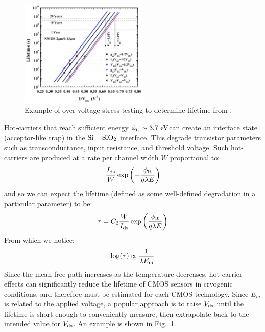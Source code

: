 \documentclass[12pt]{article}
\begin{document}
\begin{figure}[htbp]
\begin{center}
\includegraphics[width=0.55\textwidth]{figs/lifetime_vstress.png} 
\caption{Example of over-voltage stress-testing to determine lifetime from \cite{hot-carrier-effects}.}
\label{fig:lifetime}
\end{center}
\end{figure}

Hot-carriers that reach sufficient energy $\phi_{\rm it} \sim 3.7~\rm eV$can create an interface state (acceptor-like trap) in the $\rm Si-SiO_2$ interface.  This degrade transistor parameters such as transconductance, input resistance, and threshold voltage.  Such hot-carriers are produced at a rate per channel width $W$ proportional to:
\begin{displaymath}
\frac{I_{\rm ds}}{W} \exp\left(-\frac{\phi_{\rm it}}{q \lambda E_{\rm}}\right)
\end{displaymath}
and so we can expect the lifetime (defined as some well-defined degradation in a particular parameter)
to be:
\begin{equation}\label{eqn:tau}
\tau = C_2 \frac{W}{I_{\rm ds}}\exp\left(\frac{\phi_{\rm it}}{q \lambda E_{\rm}}\right)
\end{equation}
From which we notice: 
\begin{displaymath}
\log(\tau) \propto \frac{1}{\lambda E_{\rm m}}
\end{displaymath}
Since the mean free path increases as the temperature decreases, hot-carrier effects can significantly reduce the lifetime of CMOS sensors in cryogenic conditions, and therefore must be estimated for each CMOS technology.  Since $E_m$ is related to the applied voltage, a popular approach is to raise $V_{\rm ds}$ until the lifetime is short enough to conveniently measure, then extrapolate back to the intended value for $V_{\rm ds}$.  An example is shown in Fig.~\ref{fig:lifetime}.
\end{document}
